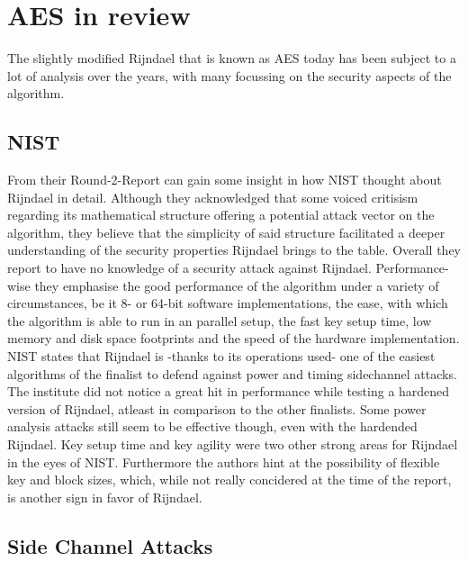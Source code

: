 \section{AES in review}
\label{ch:aes-review}

The slightly modified Rijndael that is known as AES today has been subject to a lot of analysis over the years, with many focussing on the security aspects of the algorithm.

\subsection{NIST}
\label{ch:nist-review}

From their Round-2-Report \cite{round2report} can gain some insight in how NIST thought about Rijndael in detail. 
Although they acknowledged that some voiced critisism regarding its mathematical structure offering a potential attack vector on the algorithm, they believe that the simplicity of said structure facilitated a deeper understanding of the security properties Rijndael brings to the table. Overall they report to have no knowledge of a security attack against Rijndael.
Performance-wise they emphasise the good performance of the algorithm under a variety of circumstances, be it 8- or 64-bit software implementations, the ease, with which the algorithm is able to run in an parallel setup, the fast key setup time, low memory and disk space footprints and the speed of the hardware implementation.
NIST states that Rijndael is -thanks to its operations used- one of the easiest algorithms of the finalist to defend against power and timing sidechannel attacks. The institute did not notice a great hit in performance while testing a hardened version of Rijndael, atleast in comparison to the other finalists. Some power analysis attacks still seem to be effective though, even with the hardended Rijndael.
Key setup time and key agility were two other strong areas for Rijndael in the eyes of NIST. Furthermore the authors hint at the possibility of flexible key and block sizes, which, while not really concidered at the time of the report, is another sign in favor of Rijndael.

\subsection{Side Channel Attacks}
\label{ch:sidechannelattacks}

